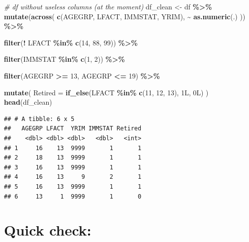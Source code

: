 \documentclass[
]{article}
\newenvironment{Shaded}{\begin{snugshade}}{\end{snugshade}}
\newcommand{\AttributeTok}[1]{\textcolor[rgb]{0.13,0.29,0.53}{#1}}
\newcommand{\CommentTok}[1]{\textcolor[rgb]{0.56,0.35,0.01}{\textit{#1}}}
\newcommand{\DataTypeTok}[1]{\textcolor[rgb]{0.13,0.29,0.53}{#1}}
\newcommand{\DecValTok}[1]{\textcolor[rgb]{0.00,0.00,0.81}{#1}}
\newcommand{\FunctionTok}[1]{\textcolor[rgb]{0.13,0.29,0.53}{\textbf{#1}}}
\newcommand{\NormalTok}[1]{#1}
\newcommand{\OtherTok}[1]{\textcolor[rgb]{0.56,0.35,0.01}{#1}}
\newcommand{\SpecialCharTok}[1]{\textcolor[rgb]{0.81,0.36,0.00}{\textbf{#1}}}
\begin{document}
\begin{Shaded}
\begin{Highlighting}[]
\CommentTok{\# df without useless columns (at the moment)}
\NormalTok{df\_clean }\OtherTok{\textless{}{-}}\NormalTok{ df }\SpecialCharTok{\%\textgreater{}\%}
  \FunctionTok{mutate}\NormalTok{(}\FunctionTok{across}\NormalTok{(}
    \FunctionTok{c}\NormalTok{(AGEGRP, LFACT, IMMSTAT, YRIM),}
    \SpecialCharTok{\textasciitilde{}} \FunctionTok{as.numeric}\NormalTok{(.)}
\NormalTok{  )) }\SpecialCharTok{\%\textgreater{}\%}
  
  \FunctionTok{filter}\NormalTok{(}\SpecialCharTok{!}\NormalTok{ LFACT }\SpecialCharTok{\%in\%} \FunctionTok{c}\NormalTok{(}\DecValTok{14}\NormalTok{, }\DecValTok{88}\NormalTok{, }\DecValTok{99}\NormalTok{)) }\SpecialCharTok{\%\textgreater{}\%}
  
  \FunctionTok{filter}\NormalTok{(IMMSTAT }\SpecialCharTok{\%in\%} \FunctionTok{c}\NormalTok{(}\DecValTok{1}\NormalTok{, }\DecValTok{2}\NormalTok{)) }\SpecialCharTok{\%\textgreater{}\%}
  
  \FunctionTok{filter}\NormalTok{(AGEGRP }\SpecialCharTok{\textgreater{}=} \DecValTok{13}\NormalTok{, AGEGRP }\SpecialCharTok{\textless{}=} \DecValTok{19}\NormalTok{) }\SpecialCharTok{\%\textgreater{}\%}
  
  \FunctionTok{mutate}\NormalTok{(}
    \AttributeTok{Retired =} \FunctionTok{if\_else}\NormalTok{(LFACT }\SpecialCharTok{\%in\%} \FunctionTok{c}\NormalTok{(}\DecValTok{11}\NormalTok{, }\DecValTok{12}\NormalTok{, }\DecValTok{13}\NormalTok{), }\DecValTok{1}\DataTypeTok{L}\NormalTok{, }\DecValTok{0}\DataTypeTok{L}\NormalTok{)}
\NormalTok{  )}
\FunctionTok{head}\NormalTok{(df\_clean)}
\end{Highlighting}
\end{Shaded}

\begin{verbatim}
## # A tibble: 6 x 5
##   AGEGRP LFACT  YRIM IMMSTAT Retired
##    <dbl> <dbl> <dbl>   <dbl>   <int>
## 1     16    13  9999       1       1
## 2     18    13  9999       1       1
## 3     16    13  9999       1       1
## 4     16    13     9       2       1
## 5     16    13  9999       1       1
## 6     13     1  9999       1       0
\end{verbatim}

\section{Quick check:}\label{quick-check}
\end{document}
